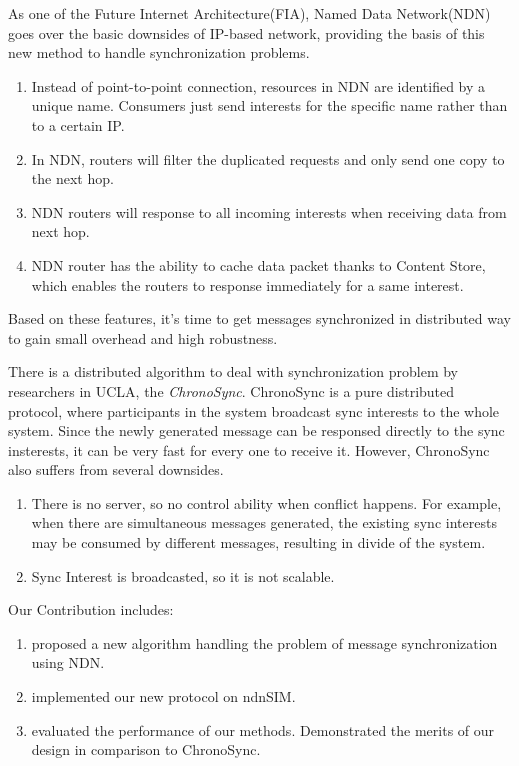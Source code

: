 \documentclass[conference]{IEEEtran}
\begin{document}
As one of the Future Internet Architecture(FIA)\cite{FIA},
Named Data Network(NDN)\cite{NDN001} goes over the basic downsides of IP-based network,
providing the basis of this new method to handle synchronization problems.
\begin{enumerate}{}
	\item Instead of point-to-point connection, resources in NDN are identified by a unique name.
Consumers just send interests for the specific name rather than to a certain IP.
	\item In NDN, routers will filter the duplicated requests and only send one copy to the next hop.
	\item NDN routers will response to all incoming interests when receiving data from next hop.
	\item NDN router has the ability to cache data packet thanks to Content Store,
which enables the routers to response immediately for a same interest.
\end{enumerate}
Based on these features, it's time to get messages synchronized in distributed way
to gain small overhead and high robustness.

There is a distributed algorithm to deal with synchronization problem by researchers in UCLA, the
\emph{ChronoSync\cite{ChronoSync}}.
ChronoSync is a pure distributed protocol,
where participants in the system broadcast sync interests to the whole system.
Since the newly generated message can be responsed directly to the sync insterests,
it can be very fast for every one to receive it.
However, ChronoSync also suffers from several downsides.
\begin{enumerate}{}
	\item There is no server, so no control ability when conflict happens.
For example, when there are simultaneous messages generated,
the existing sync interests may be consumed by different messages,
resulting in divide of the system.
	\item Sync Interest is broadcasted, so it is not scalable.
\end{enumerate}

Our Contribution includes:
\begin{enumerate}{}
	\item proposed a new algorithm handling the problem of message synchronization using NDN.
	\item implemented our new protocol on ndnSIM\cite{ndnSIM}.
	\item evaluated the performance of our methods.
Demonstrated the merits of our design in comparison to ChronoSync.
\end{enumerate}
\end{document}
